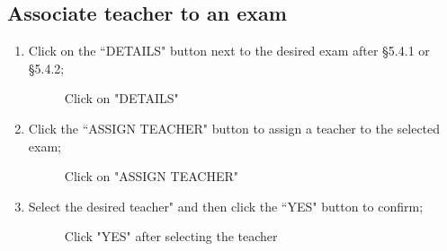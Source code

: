 \documentclass[ManualeUtente]{subfiles}
\begin{document}
	\subsection{Associate teacher to an exam}
	\begin{enumerate}
		\item Click on the \textquotedblleft DETAILS" button next to the desired exam after \S 5.4.1 or \S 5.4.2;
		\begin{figure}[H]
			\centering
			\caption{Click on "DETAILS"}
			\label{fig:Click on "DETAILS"}
		\end{figure}
		\item Click the \textquotedblleft ASSIGN TEACHER" button to assign a teacher to the selected exam;
		\begin{figure}[H]
			\centering
			\caption{Click on "ASSIGN TEACHER"}
			\label{fig:Click on "ASSIGN TEACHER"}
		\end{figure}
		\item Select the desired teacher" and then click the \textquotedblleft YES" button to confirm;
		\begin{figure}[H]
			\centering
			\caption{Click "YES" after selecting the teacher}
			\label{fig:Click "YES" after selecting the teacher}
		\end{figure}
	\end{enumerate}
	
\end{document}
